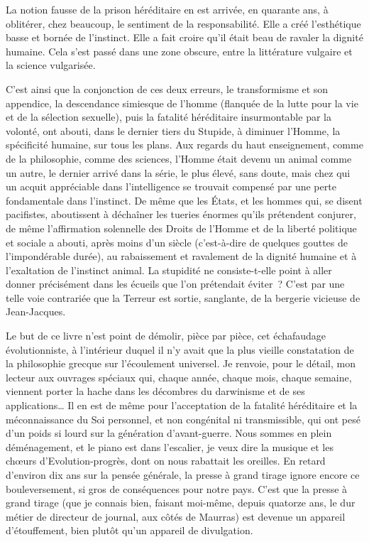 \documentclass[french,twoside]{book} %
\begin{document}
La notion fausse de la prison héréditaire en est arrivée, en quarante ans, à oblitérer, chez beaucoup, le sentiment de la responsabilité. Elle a créé l’esthétique basse et bornée de l’instinct. Elle a fait croire qu’il était beau de ravaler la dignité humaine. Cela s’est passé dans une zone obscure, entre la littérature vulgaire et la science vulgarisée.\par
C’est ainsi que la conjonction de ces deux erreurs, le transformisme et son appendice, la descendance simiesque de l’homme (flanquée de la lutte pour la vie et de la sélection sexuelle), puis la fatalité héréditaire insurmontable par la volonté, ont abouti, dans le dernier tiers du Stupide, à diminuer l’Homme, la spécificité humaine, sur tous les plans. Aux regards du haut enseignement, comme de la philosophie, comme des sciences, l’Homme était devenu un animal comme un autre, le dernier arrivé dans la série, le plus élevé, sans doute, mais chez qui un acquit appréciable dans l’intelligence se trouvait compensé par une perte fondamentale dans l’instinct. De même que les États, et les hommes qui, se disent pacifistes, aboutissent à déchaîner les tueries énormes qu’ils prétendent conjurer, de même l’affirmation solennelle des Droits de l’Homme et de la liberté politique et sociale a abouti, après moins d’un siècle (c’est-à-dire de quelques gouttes de l’impondérable durée), au rabaissement et ravalement de la dignité humaine et à l’exaltation de l’instinct animal. La stupidité ne consiste-t-elle point à aller donner précisément dans les écueils que l’on prétendait éviter ? C’est par une telle voie contrariée que la Terreur est sortie, sanglante, de la bergerie vicieuse de Jean-Jacques.\par
Le but de ce livre n’est point de démolir, pièce par pièce, cet échafaudage évolutionniste, à l’intérieur duquel il n’y avait que la plus vieille constatation de la philosophie grecque sur l’écoulement universel. Je renvoie, pour le détail, mon lecteur aux ouvrages spéciaux qui, chaque année, chaque mois, chaque semaine, viennent porter la hache dans les décombres du darwinisme et de ses applications… Il en est de même pour l’acceptation de la fatalité héréditaire et la méconnaissance du Soi personnel, et non congénital ni transmissible, qui ont pesé d’un poids si lourd sur la génération d’avant-guerre. Nous sommes en plein déménagement, et le piano est dans l’escalier, je veux dire la musique et les chœurs d’Evolution-progrès, dont on nous rabattait les oreilles. En retard d’environ dix ans sur la pensée générale, la presse à grand tirage ignore encore ce bouleversement, si gros de conséquences pour notre pays. C’est que la presse à grand tirage (que je connais bien, faisant moi-même, depuis quatorze ans, le dur métier de directeur de journal, aux côtés de Maurras) est devenue un appareil d’étouffement, bien plutôt qu’un appareil de divulgation.\par
\end{document}
